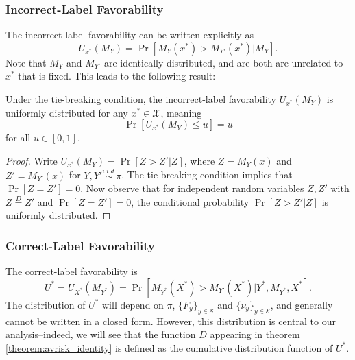 \documentclass[twoside,11pt]{article}
\begin{document}
\subsubsection{Incorrect-Label Favorability}
The incorrect-label favorability can be written explicitly as
\begin{equation}
U_{x^*}(M_Y) = \Pr[M_{Y}(x^*) > M_{Y'}(x^*)|M_{Y}].
\end{equation}
Note that $M_Y$ and $M_{Y'}$ are identically distributed, and are both
are unrelated to $x^*$ that is fixed. This leads to the following
result:
\begin{lemma}\label{lemma:U_function}
Under the tie-breaking condition, the incorrect-label favorability
$U_{x^*}(M_Y)$ is uniformly distributed for any $x^* \in \mathcal{X}$,
meaning \begin{equation}\label{eq:Uniform} \Pr[U_{x^*}(M_Y) \leq u] = u
\end{equation}
for all $u \in [0,1].$
\end{lemma}

\begin{proof} Write $U_{x^*}(M_Y) = \Pr[Z > Z'|Z]$, where $Z = M_Y(x)$ and $Z' =
M_{Y'}(x)$ for $Y, Y' \stackrel{i.i.d.}{\sim} \pi$.
The tie-breaking condition implies that $\Pr[Z=Z']=0$.  Now observe that for independent random variables $Z, Z'$ with $Z \stackrel{D}{=} Z'$ and $\Pr[Z=Z']=0$, the conditional probability
$\Pr[Z > Z'|Z]$ is uniformly distributed.
\end{proof}


\subsubsection{Correct-Label Favorability}

The correct-label favorability is 
\begin{equation}
U^* = U_{X^*}(M_{Y^*}) = \Pr[M_{Y^*}(X^*) > M_{Y'}(X^*)|Y^*,M_{Y^*},X^*].
\end{equation}
The distribution of $U^*$ will depend on $\pi$, $\{F_y\}_{y \in \mathcal{S}}$ and $\{\nu_y\}_{y \in \mathcal{S}}$, and
generally cannot be written in a closed form.  However, this
distribution is central to our analysis--indeed, we will see that the
function ${D}$ appearing in theorem \ref{theorem:avrisk_identity}
is defined as the cumulative distribution function of $U^*$.
\end{document}
